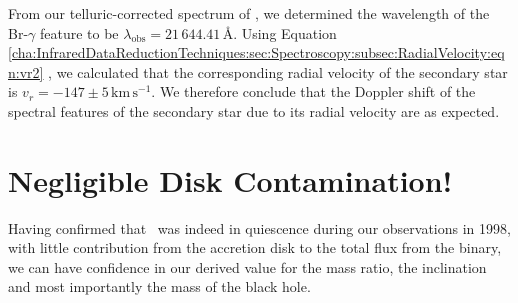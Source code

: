\vspace{\myparskip}

From our telluric-corrected spectrum of \groj, we determined the
wavelength of the Br-$\gamma$ feature to be
$\lambda_{\mathrm{obs}}=21\,644.41$\,\AA. Using Equation~%
\vref{cha:InfraredDataReductionTechniques:sec:Spectroscopy:subsec:RadialVelocity:eqn:vr2}%
, we calculated that the corresponding radial velocity of the
secondary star is $v_r = -147\pm5\,\mathrm{km}\,\mathrm{s}^{-1}$. We
therefore conclude that the Doppler shift of the spectral features of
the secondary star due to its radial velocity are as expected. %


\section{Negligible Disk Contamination!}
\label{cha:AccretionDiskContamination:sec:NegligibleDiskContamination}

Having confirmed that \groj\ was indeed in quiescence during our observations in 1998, with little contribution from the accretion disk to the total flux from the binary, we can have confidence in our derived value for the mass ratio, the inclination and most importantly the mass of the black hole. %


